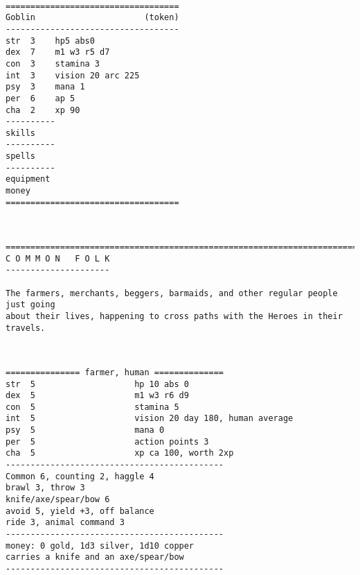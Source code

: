 \

\goodbreak \small \begin{samepage} \begin{verbatim}
===================================
Goblin                      (token)
-----------------------------------
str  3    hp5 abs0
dex  7    m1 w3 r5 d7
con  3    stamina 3
int  3    vision 20 arc 225
psy  3    mana 1
per  6    ap 5
cha  2    xp 90
----------
skills
----------
spells
----------
equipment
money
===================================
\end{verbatim} \end{samepage} \normalsize

\









\goodbreak
{}


\goodbreak \begin{samepage} \small \begin{verbatim}
================================================================================
C O M M O N   F O L K 
---------------------

The farmers, merchants, beggers, barmaids, and other regular people just going
about their lives, happening to cross paths with the Heroes in their travels.
\end{verbatim} \normalsize \end{samepage}

\

\goodbreak \begin{samepage} \small \begin{verbatim}
=============== farmer, human ==============
str  5                    hp 10 abs 0
dex  5                    m1 w3 r6 d9
con  5                    stamina 5
int  5                    vision 20 day 180, human average
psy  5                    mana 0
per  5                    action points 3
cha  5                    xp ca 100, worth 2xp
--------------------------------------------
Common 6, counting 2, haggle 4
brawl 3, throw 3
knife/axe/spear/bow 6
avoid 5, yield +3, off balance
ride 3, animal command 3
--------------------------------------------
money: 0 gold, 1d3 silver, 1d10 copper
carries a knife and an axe/spear/bow
--------------------------------------------
\end{verbatim} \normalsize \end{samepage}

